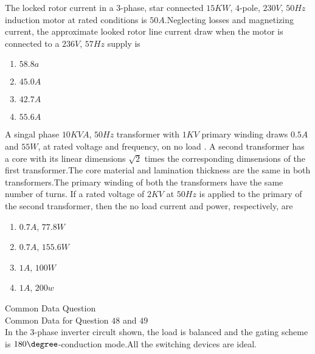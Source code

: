     \item The locked rotor current in a $3$-phase, star connected $15 KW$, $4$-pole, $230 V$, $50Hz$ induction motor at rated conditions is $50 A$.Neglecting losses and magnetizing current, the approximate looked rotor line  current draw when the motor is connected to a $236 V$, $57 Hz$ supply is\\
    \begin{enumerate}
        \item$58.8 a$\\
        \item$45.0 A$\\
        \item$42.7 A$\\
        \item$55.6 A$
    \end{enumerate}
    \item A singal phase $10 KV A$, $50 Hz$ transformer with $1 KV$ primary winding draws $0.5 A$ and $55 W$, at rated voltage and frequency, on no load . A second transformer has a core with its linear dimensions $\sqrt{2}$ times the corresponding dimsensions of the first transformer.The core material and lamination thickness are the same in both transformers.The primary winding of both the transformers have the same number of turns. If a rated voltage of $2 KV$ at $50 Hz$ is applied to the primary of the second transformer, then the no load current and power, respectively, are\\
    \begin{enumerate}
        \item$0.7 A$, $77.8 W$\\
        \item$0.7 A$, $155.6 W$\\
        \item$1 A$, $100 W$\\
        \item$1 A$, $200 w$
    \end{enumerate}
    Common Data Question\\
    Common Data for Question $48$ and $49$\\
    In the 3-phase inverter circult shown, the load is balanced and the gating scheme is $180\degree$-conduction mode.All the switching devices are ideal.

